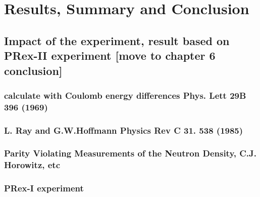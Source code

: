 \chapter{Results, Summary and Conclusion}

\section{Impact of the experiment, result based on PRex-II experiment [move to chapter 6 conclusion]}

\subsection{calculate with Coulomb energy differences Phys. Lett 29B 396 (1969)}
\subsection{L. Ray and G.W.Hoffmann Physics Rev C 31. 538 (1985)}
\subsection{ Parity Violating Measurements of the Neutron Density, C.J. Horowitz, etc}
\subsection{PRex-I experiment}
